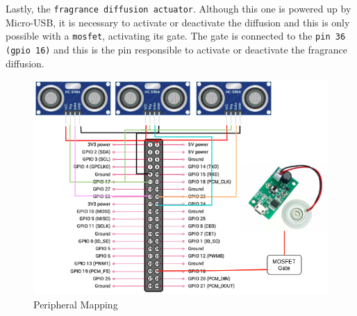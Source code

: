 Lastly, the \texttt{fragrance diffusion actuator}. Although this one is powered up by Micro-USB, it is necessary to activate or deactivate the diffusion and this is only possible with a \texttt{\gls{mosfet}}, activating its gate. The gate is connected to the \texttt{pin 36 (\gls{gpio} 16)} and this is the pin responsible to activate or deactivate the fragrance diffusion.
%
\begin{figure}[htb!]
\centering
    \includegraphics[width=0.8\columnwidth]{./img/hw-pinout.png}
  \caption{Peripheral Mapping}%
\label{fig:peripheral-mapping}
\end{figure}

